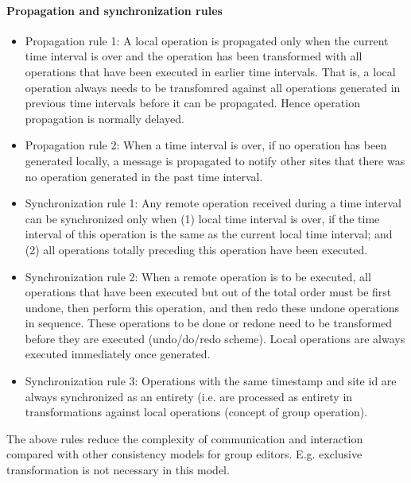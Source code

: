 \paragraph{Propagation and synchronization rules}
\begin{itemize}
 \item Propagation rule 1: A local operation is propagated only when the current time interval is over and the operation has been transformed with all operations that have been executed in earlier time intervals. That is, a local operation always needs to be transfomred against all operations generated in previous time intervals before it can be propagated. Hence operation propagation is normally delayed.
 \item Propagation rule 2: When a time interval is over, if no operation has been generated locally, a message is propagated to notify other sites that there was no operation generated in the past time interval. 
 \item Synchronization rule 1: Any remote operation received during a time interval can be synchronized only when (1) local time interval is over, if the time interval of this operation is the same as the current local time interval; and (2) all operations totally preceding this operation have been executed.
 \item Synchronization rule 2: When a remote operation is to be executed, all operations that have been executed but out of the total order must be first undone, then perform this operation, and then redo these undone operations in sequence. These operations to be done or redone need to be transformed before they are executed (undo/do/redo scheme). Local operations are always executed immediately once generated.
 \item Synchronization rule 3: Operations with the same timestamp and site id are always synchronized as an entirety (i.e. are processed as entirety in transformations against local operations (concept of group operation).
\end{itemize}
The above rules reduce the complexity of communication and interaction compared with other consistency models for group editors. E.g. exclusive transformation is not necessary in this model.

